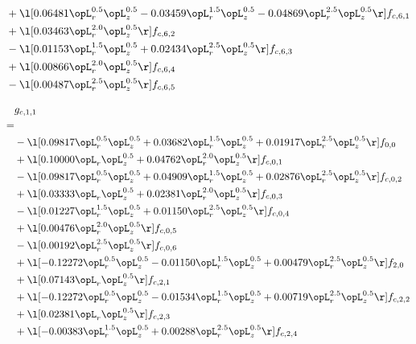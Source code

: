 \begin{alignat}{2}
& + \l[  0.06481 \opL_r^{0.5} \opL_z^{0.5}   -0.03459 \opL_r^{1.5} \opL_z^{0.5}   -0.04869 \opL_r^{2.5} \opL_z^{0.5}  \r] f_{c,6,1} \nonumber \\ 
& + \l[  0.03463 \opL_r^{2.0} \opL_z^{0.5}  \r] f_{c,6,2} \nonumber \\ 
& - \l[  0.01153 \opL_r^{1.5} \opL_z^{0.5} +  0.02434 \opL_r^{2.5} \opL_z^{0.5}  \r] f_{c,6,3} \nonumber \\ 
& + \l[  0.00866 \opL_r^{2.0} \opL_z^{0.5}  \r] f_{c,6,4} \nonumber \\ 
& - \l[  0.00487 \opL_r^{2.5} \opL_z^{0.5}  \r] f_{c,6,5} \nonumber \\ 
\end{alignat} 


\begin{alignat}{2} 
\label{eq:g_11_0} 
& g_{c,1,1} \nonumber \\ 
 = \\ 
& - \l[  0.09817 \opL_r^{0.5} \opL_z^{0.5} +  0.03682 \opL_r^{1.5} \opL_z^{0.5} +  0.01917 \opL_r^{2.5} \opL_z^{0.5}  \r] f_{0,0} \nonumber \\ 
& + \l[  0.10000 \opL_r \opL_z^{0.5} +  0.04762 \opL_r^{2.0} \opL_z^{0.5}  \r] f_{c,0,1} \nonumber \\ 
& - \l[  0.09817 \opL_r^{0.5} \opL_z^{0.5} +  0.04909 \opL_r^{1.5} \opL_z^{0.5} +  0.02876 \opL_r^{2.5} \opL_z^{0.5}  \r] f_{c,0,2} \nonumber \\ 
& + \l[  0.03333 \opL_r \opL_z^{0.5} +  0.02381 \opL_r^{2.0} \opL_z^{0.5}  \r] f_{c,0,3} \nonumber \\ 
& - \l[  0.01227 \opL_r^{1.5} \opL_z^{0.5} +  0.01150 \opL_r^{2.5} \opL_z^{0.5}  \r] f_{c,0,4} \nonumber \\ 
& + \l[  0.00476 \opL_r^{2.0} \opL_z^{0.5}  \r] f_{c,0,5} \nonumber \\ 
& - \l[  0.00192 \opL_r^{2.5} \opL_z^{0.5}  \r] f_{c,0,6} \nonumber \\ 
& + \l[  -0.12272 \opL_r^{0.5} \opL_z^{0.5}   -0.01150 \opL_r^{1.5} \opL_z^{0.5} +  0.00479 \opL_r^{2.5} \opL_z^{0.5}  \r] f_{2,0} \nonumber \\ 
& + \l[  0.07143 \opL_r \opL_z^{0.5}  \r] f_{c,2,1} \nonumber \\ 
& + \l[  -0.12272 \opL_r^{0.5} \opL_z^{0.5}   -0.01534 \opL_r^{1.5} \opL_z^{0.5} +  0.00719 \opL_r^{2.5} \opL_z^{0.5}  \r] f_{c,2,2} \nonumber \\ 
& + \l[  0.02381 \opL_r \opL_z^{0.5}  \r] f_{c,2,3} \nonumber \\ 
& + \l[  -0.00383 \opL_r^{1.5} \opL_z^{0.5} +  0.00288 \opL_r^{2.5} \opL_z^{0.5}  \r] f_{c,2,4} \nonumber \\ 

\end{alignat}
